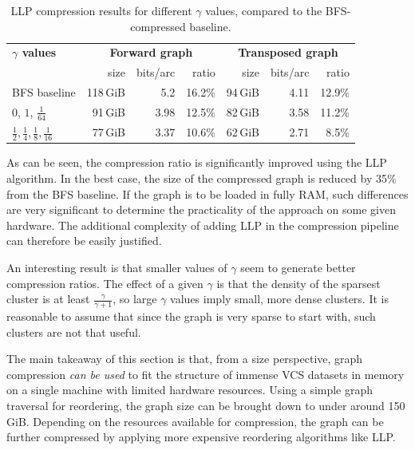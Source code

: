 \begin{table}
  \centering
  \caption{LLP compression results for different $\gamma$ values, compared to
    the BFS-compressed baseline.}%
  \label{tab:compression-llp-gammas}

  \renewcommand{\arraystretch}{1.5}
  \begin{tabular}{l r r r r r r}
      \hline \textbf{$\gamma$ values} \hspace{4em}
      & \multicolumn{3}{c}{\textbf{Forward graph}}
      & \multicolumn{3}{c}{\textbf{Transposed graph}} \\

      & size & bits/arc & ratio
      & size & bits/arc & ratio \\

      \hline BFS baseline
      & 118\,GiB & 5.2 & 16.2\%
      & 94\,GiB & 4.11 & 12.9\% \\

      \hline $0$, $1$, $\frac{1}{64}$
      & 91\,GiB & 3.98 & 12.5\%
      & 82\,GiB & 3.58 & 11.2\% \\

      \hline $\frac{1}{2}, \frac{1}{4}, \frac{1}{8}, \frac{1}{16}$
      & 77\,GiB & 3.37 & 10.6\%
      & 62\,GiB & 2.71 & 8.5\% \\
    \hline
  \end{tabular}
\end{table}

As can be seen, the compression ratio is significantly improved using the LLP
algorithm. In the best case, the size of the compressed graph is reduced by
35\% from the BFS baseline. If the graph is to be loaded in fully RAM, such
differences are very significant to determine the practicality of the approach
on some given hardware. The additional complexity of adding LLP in the
compression pipeline can therefore be easily justified.

An interesting result is that smaller values of $\gamma$ seem to generate
better compression ratios.
The effect of a given $\gamma$ is that the density of the sparsest cluster is
at least $\frac{\gamma}{\gamma+1}$, so large $\gamma$ values imply small, more
dense clusters.  It is reasonable to assume that since the graph is very sparse
to start with, such clusters are not that useful.

\bigskip

The main takeaway of this section is that, from a size perspective, graph
compression \emph{can be used} to fit the structure of immense VCS datasets in
memory on a single machine with limited hardware resources. Using a simple
graph traversal for reordering, the graph size can be brought down to under
around 150 GiB. Depending on the resources available for compression, the
graph can be further compressed by applying more expensive reordering
algorithms like \gls{LLP}.


